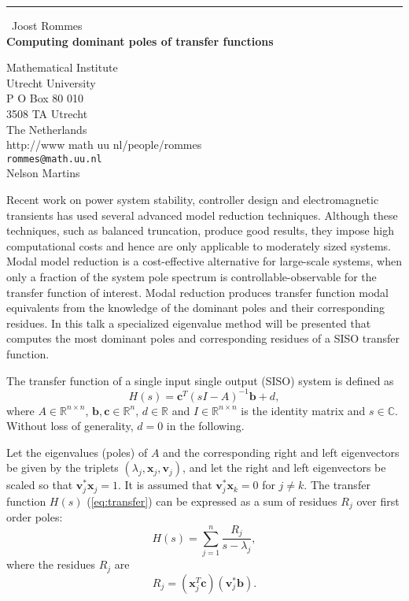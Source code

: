 \documentclass{report}
\begin{document}
\begin{center}
\rule{6in}{1pt} \
{\large Joost Rommes \\
{\bf Computing dominant poles of transfer functions}}

Mathematical Institute \\ Utrecht University \\ P O Box 80 010 \\ 3508 TA Utrecht \\ The Netherlands \\ http://www math uu nl/people/rommes
\\
{\tt rommes@math.uu.nl}\\
Nelson Martins\end{center}

\newcommand{\vx}{\mathbf{x}}
\newcommand{\vv}{\mathbf{v}}
\newcommand{\vtx}{\tilde{\mathbf{x}}}
\newcommand{\vtv}{\tilde{\mathbf{v}}}
\newcommand{\vb}{\mathbf{b}}
\newcommand{\vc}{\mathbf{c}}
\newcommand{\mR}{\mathbb{R}}
\newcommand{\mRn}{\mathbb{R}^n}
\newcommand{\mRnn}{\mathbb{R}^{n\times n}}
\newcommand{\mC}{\mathbb{C}}

Recent work on power system stability, controller design and
electromagnetic transients has used several advanced
model reduction techniques. Although these
techniques, such as balanced truncation, produce good results, they impose high
computational costs and hence are only applicable to moderately sized
systems. Modal model reduction is a cost-effective alternative for
large-scale systems, when only a fraction of the system pole spectrum is
controllable-observable for the transfer function of interest. Modal reduction
produces transfer function modal equivalents from the knowledge of the dominant
poles and their corresponding residues. In this talk a specialized eigenvalue
method will be presented that computes the most dominant poles and corresponding
residues of a SISO transfer function.

The transfer function of a single input single output (SISO) system is defined as
\begin{equation}\label{eq:transfer}
H(s) = \vc^T (sI - A)^{-1}\vb + d,
\end{equation}
where $A\in\mRnn$, $\vb,\vc\in\mRn$, $d\in\mR$ and $I\in\mRnn$ is the
identity matrix and $s\in\mC$. Without loss of generality, $d=0$ in the
following.

Let the eigenvalues (poles) of $A$ and the corresponding right and left eigenvectors be
given by the triplets $(\lambda_j,\vx_j,\vv_j)$, and let the right and left
eigenvectors be scaled so that $\vv_j^*\vx_j=1$. It is assumed that $\vv_j^*\vx_k=0$ for
$j\neq k$. The transfer function
$H(s)$ (\ref{eq:transfer}) can be expressed as a sum of residues $R_j$
over first order poles:
\begin{equation}
H(s) = \sum_{j=1}^n \frac{R_j}{s - \lambda_j},\nonumber
\end{equation}
where the residues $R_j$ are
\begin{equation}
R_j = (\vx_j^T\vc)(\vv_j^*\vb).\nonumber
\end{equation}
\end{document}
